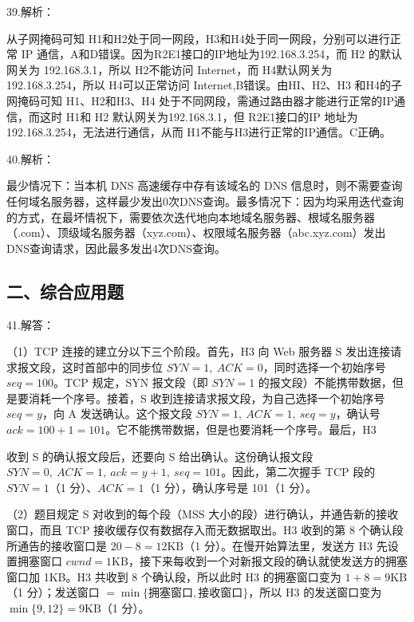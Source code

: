 \documentclass[UTF8,11pt]{ctexart}
\begin{document}
39.解析：


从子网掩码可知 H1和H2处于同一网段，H3和H4处于同一网段，分别可以进行正常 IP 通信，A和D错误。因为R2E1接口的IP地址为192.168.3.254，而 H2 的默认网关为 192.168.3.1，所以 H2不能访问 Internet，而 H4默认网关为 192.168.3.254，所以 H4可以正常访问 Internet,B错误。由HI、H2、H3 和H4的子网掩码可知 H1、H2和H3、H4 处于不同网段，需通过路由器才能进行正常的IP通信，而这时 H1和 H2 默认网关为192.168.3.1，但 R2E1接口的IP 地址为192.168.3.254，无法进行通信，从而 H1不能与H3进行正常的IP通信。C正确。


40.解析：


最少情况下：当本机 DNS 高速缓存中存有该域名的 DNS 信息时，则不需要查询任何域名服务器，这样最少发出0次DNS查询。最多情况下：因为均采用迭代查询的方式，在最坏情祝下，需要依次迭代地向本地域名服务器、根域名服务器（.com）、顶级域名服务器（xyz.com）、权限域名服务器（abc.xyz.com）发出 DNS查询请求，因此最多发出4次DNS查询。


\subsection*{二、综合应用题}

41.解答：


（1）TCP 连接的建立分以下三个阶段。首先，H3 向 Web 服务器 S 发出连接请求报文段，这时首部中的同步位 \(\displaystyle SYN=1,\allowbreak \ ACK=0\)，同时选择一个初始序号 \(\displaystyle seq=100\)。TCP 规定，SYN 报文段（即 \(\displaystyle SYN=1\) 的报文段）不能携带数据，但是要消耗一个序号。接着，S 收到连接请求报文段，为自己选择一个初始序号 \(\displaystyle seq=y\)，向 A 发送确认。这个报文段 \(\displaystyle SYN=1,\allowbreak \ ACK=1,\allowbreak \ seq=y\)，确认号 \(\displaystyle ack=100+1=101\)。它不能携带数据，但是也要消耗一个序号。最后，H3


收到 S 的确认报文段后，还要向 S 给出确认。这份确认报文段 \(\displaystyle SYN=0,\allowbreak \ ACK=1,\allowbreak \ ack=y+1,\allowbreak \ seq=101\)。因此，第二次握手 TCP 段的 \(\displaystyle SYN=1\)（1 分）、\(\displaystyle ACK=1\)（1 分），确认序号是 101（1 分）。


（2）题目规定 S 对收到的每个段（MSS 大小的段）进行确认，并通告新的接收窗口，而且 TCP 接收缓存仅有数据存入而无数据取出。H3 收到的第 8 个确认段所通告的接收窗口是 \(\displaystyle 20-8=12\mathrm{KB}\)（1 分）。在慢开始算法里，发送方 H3 先设置拥塞窗口 \(\displaystyle cwnd=1\mathrm{KB}\)，接下来每收到一个对新报文段的确认就使发送方的拥塞窗口加 1KB。H3 共收到 8 个确认段，所以此时 H3 的拥塞窗口变为 \(\displaystyle 1+8=9\mathrm{KB}\)（1 分）；发送窗口 \(\displaystyle =\displaystyle \min\{\text{拥塞窗口},\allowbreak \text{接收窗口}\}\)，所以 H3 的发送窗口变为 \(\displaystyle \min\{9,\allowbreak 12\}=9\mathrm{KB}\)（1 分）。
\end{document}
